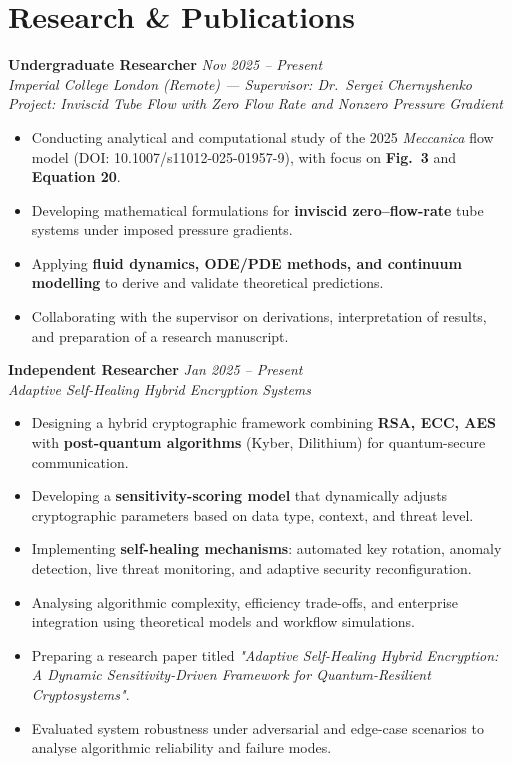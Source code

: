 \documentclass[a4paper,10pt]{article}
\begin{document}
\section*{Research \& Publications}
\textbf{Undergraduate Researcher} \hfill \textit{Nov 2025 -- Present} \\
\emph{Imperial College London (Remote) — Supervisor: Dr.\ Sergei Chernyshenko} \\
\textit{Project: Inviscid Tube Flow with Zero Flow Rate and Nonzero Pressure Gradient}
\begin{itemize}[leftmargin=*]
    \item Conducting analytical and computational study of the 2025 \textit{Meccanica} flow model (DOI: 10.1007/s11012-025-01957-9), with focus on \textbf{Fig.\ 3} and \textbf{Equation 20}.
    \item Developing mathematical formulations for \textbf{inviscid zero–flow-rate} tube systems under imposed pressure gradients.
    \item Applying \textbf{fluid dynamics, ODE/PDE methods, and continuum modelling} to derive and validate theoretical predictions.
    \item Collaborating with the supervisor on derivations, interpretation of results, and preparation of a research manuscript.
\end{itemize}


\textbf{Independent Researcher} \hfill \textit{Jan 2025 -- Present} \\
\emph{Adaptive Self-Healing Hybrid Encryption Systems}
\begin{itemize}[leftmargin=*]
    \item Designing a hybrid cryptographic framework combining \textbf{RSA, ECC, AES} with \textbf{post-quantum algorithms} (Kyber, Dilithium) for quantum-secure communication.
    \item Developing a \textbf{sensitivity-scoring model} that dynamically adjusts cryptographic parameters based on data type, context, and threat level.
    \item Implementing \textbf{self-healing mechanisms}: automated key rotation, anomaly detection, live threat monitoring, and adaptive security reconfiguration.
    \item Analysing algorithmic complexity, efficiency trade-offs, and enterprise integration using theoretical models and workflow simulations.
    \item Preparing a research paper titled \textit{"Adaptive Self-Healing Hybrid Encryption: A Dynamic Sensitivity-Driven Framework for Quantum-Resilient Cryptosystems"}.
    \item Evaluated system robustness under adversarial and edge-case scenarios to analyse algorithmic reliability and failure modes.
\end{itemize}
\end{document}
